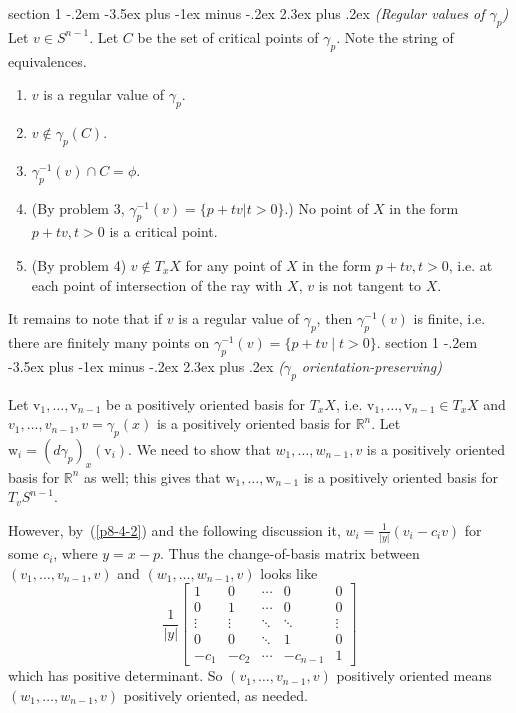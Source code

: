 \documentclass[12pt]{article}
\makeatletter
\theoremstyle{norm}
\newcommand{\R}[0]{\mathbb{R}}
\newcommand{\nin}[0]{\not\in}
\newcommand{\rc}[1]{\frac{1}{#1}}
\newcommand{\ga}[0]{\gamma}
\newenvironment{problem}{\@startsection
       {section}
       {1}
       {-.2em}
       {-3.5ex plus -1ex minus -.2ex}
       {2.3ex plus .2ex}
       {\pagebreak[3]%
       \large\bf\noindent{Problem }
       }
       }
       {%
       }
\makeatother
\begin{document}
\begin{problem}{\it(Regular values of $\ga_p$)}
Let $v\in S^{n-1}$. Let $C$ be the set of critical points of $\ga_p$. Note the string of equivalences.
\begin{enumerate}
\item
$v$ is a regular value of $\ga_p$.
\item
$v\nin \ga_p(C)$.
\item 
$\ga_p^{-1}(v)\cap C=\phi$.
\item
(By problem 3, $\ga_p^{-1}(v)=\{p+tv|t>0\}$.)
No point of $X$ in the form $p+tv,t>0$ is a critical point. 
\item
(By problem 4) $v\nin T_xX$ for any point of $X$ in the form $p+tv,t>0$, i.e. at each point of intersection of the ray with $X$, $v$ is not tangent to $X$.
\end{enumerate}
It remains to note that if $v$ is a regular value of $\ga_p$, then $\ga_p^{-1}(v)$ is finite, i.e. there are finitely many points on $\ga_p^{-1}(v)=\{p+tv\mid t>0\}$.
\end{problem}
\begin{problem}{\it($\ga_p$ orientation-preserving)}

Let $\text{v}_1,\ldots, \text{v}_{n-1}$ be a positively oriented basis for $T_xX$, i.e. $\text{v}_1,\ldots, \text{v}_{n-1}\in T_xX$ and $v_1,\ldots, v_{n-1},v=\ga_p(x)$ is a positively oriented basis for $\R^n$. Let $\text{w}_i=(d\ga_p)_x(\text{v}_i)$. We need to show that $w_1,\ldots, w_{n-1},v$ is a positively oriented basis for $\R^n$ as well; this gives that $\text{w}_1,\ldots, \text{w}_{n-1}$ is a positively oriented basis for $T_vS^{n-1}$.

However, %
by~(\ref{p8-4-2}) and the following discussion it, $w_i=\rc{|y|}(v_i-c_iv)$ for some $c_i$, where $y=x-p$. Thus the change-of-basis matrix between $(v_1,\ldots, v_{n-1},v)$ and $(w_1,\ldots, w_{n-1},v)$ looks like
\[
\rc{|y|}\left[\begin{array}{ccccc}
1 & 0 & \cdots & 0 & 0\\
0 & 1 & \cdots & 0 & 0\\
\vdots & \vdots & \ddots & \ddots & \vdots\\
0 & 0 & \ddots & 1 & 0\\
-c_{1} & -c_{2} & \cdots & -c_{n-1} & 1\end{array}\right]
\]
which has positive determinant. So $(v_1,\ldots, v_{n-1},v)$ positively oriented means $(w_1,\ldots, w_{n-1},v)$ positively oriented, as needed.
\end{problem}
\end{document}
